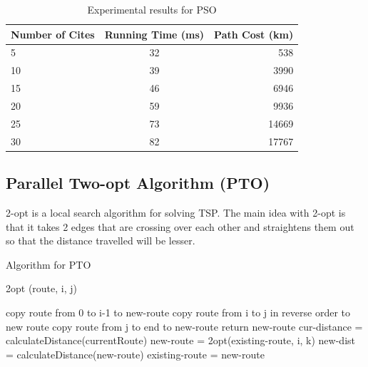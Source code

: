 \documentclass[conference]{IEEEtran}
\begin{document}
\begin{table}[h!]
  \begin{center}
    \label{tab:table2}
    \begin{tabular}{l|c|r}
      \textbf{Number of Cites} & \textbf{Running Time (ms)} & \textbf{Path Cost (km)}\\
      \hline
      5 & 32 & 538\\
      10 & 39 & 3990\\
      15 & 46 & 6946\\
      20 & 59 & 9936\\ 
      25 & 73 & 14669\\
      30 & 82 & 17767\\
    \end{tabular}
    \caption{Experimental results for PSO}
  \end{center}
\end{table}




\subsection {Parallel Two-opt Algorithm (PTO)}
2-opt is a local search algorithm for solving TSP. The main idea with 2-opt is that it takes 2 edges that are crossing over each other and straightens them out so that the distance travelled will be lesser.



\newlength\myindent
\setlength\myindent{2em}
\newcommand\bindent{%
  \begingroup
  \setlength{\itemindent}{\myindent}
  \addtolength{\algorithmicindent}{\myindent}
}
\newcommand\eindent{\endgroup}
\begin{algorithm}[H]
\caption{Algorithm for PTO}
\begin{algorithmic}[1]
\STATE 2opt (route, i, j)
\bindent
\STATE copy route from 0 to i-1 to new-route
\STATE copy route from i to j in reverse order to new route
\STATE copy route from j to end to new-route
\STATE return new-route
\eindent
\REPEAT
\STATE cur-distance = calculateDistance(currentRoute)
\STATE new-route = 2opt(existing-route, i, k)
\STATE new-dist = calculateDistance(new-route)
\STATE existing-route = new-route
\ENDIF
\ENDFOR
\ENDFOR 
{}
\end{algorithmic}
\end{algorithm} 
\end{document}
